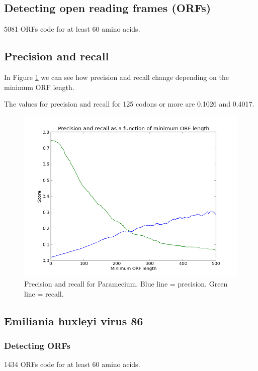 \documentclass[a4paper,11pt]{article}
\begin{document}
\subsection{Detecting open reading frames (ORFs)}

5081 ORFs code for at least 60 amino acids.


\subsection{Precision and recall}
In Figure \ref{precrec} we can see how precision and recall change depending on the minimum ORF length.

The values for precision and recall for 125 codons or more are 0.1026 and 0.4017. 

\begin{figure}[h!]
\begin{center}
\includegraphics[scale=0.65]{precision-recall.png}
\caption{Precision and recall for Paramecium. Blue line = precision. Green line = recall.}
\label{precrec}
\end{center}
\end{figure}

\subsection{Emiliania huxleyi virus 86}

\subsubsection{Detecting ORFs}
1434 ORFs code for at least 60 amino acids.
\end{document}

